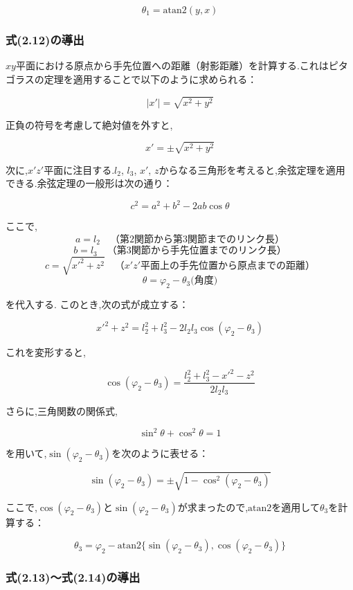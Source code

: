 \[
  \theta_1 = \text{atan2}(y, x) \tag{2.6}
\]

\subsubsection{式(2.12)の導出}

$xy$平面における原点から手先位置への距離（射影距離）を計算する.これはピタゴラスの定理を適用することで以下のように求められる：

\[
  |x'| = \sqrt{x^2 + y^2} \tag{2.7}
\]

正負の符号を考慮して絶対値を外すと,

\[
  x' = \pm \sqrt{x^2 + y^2} \tag{2.8}
\]

次に,$x'z'$平面に注目する.$l_2$, $l_3$, $x'$, $z$からなる三角形を考えると,余弦定理を適用できる.余弦定理の一般形は次の通り：

\[
  c^2 = a^2 + b^2 - 2ab \cos \theta \tag{2.9}
\]

ここで,
\[
  a = l_2 \quad \text{（第2関節から第3関節までのリンク長）}
\]
\[
  b = l_3 \quad \text{（第3関節から手先位置までのリンク長）}
\]
\[
  c = \sqrt{x'^2 + z^2} \quad \text{（$x'z'$平面上の手先位置から原点までの距離）}
\]
\[
  \theta = \varphi_2 - \theta_3 \text{(角度)}
\]

を代入する.
このとき,次の式が成立する：

\[
  x'^2 + z^2 = l_2^2 + l_3^2 - 2l_2 l_3 \cos (\varphi_2 - \theta_3)
\]

これを変形すると,

\[
  \cos(\varphi_2 - \theta_3) = \frac{l_2^2 + l_3^2 - x'^2 - z^2}{2 l_2 l_3} \tag{2.10}
\]

さらに,三角関数の関係式,

\[
  \sin^2 \theta + \cos^2 \theta = 1
\]

を用いて,$\sin(\varphi_2 - \theta_3)$を次のように表せる：

\[
  \sin(\varphi_2 - \theta_3) = \pm \sqrt{1 - \cos^2 (\varphi_2 - \theta_3)} \tag{2.11}
\]

ここで,$\cos(\varphi_2 - \theta_3)$と$\sin(\varphi_2 - \theta_3)$が求まったので,$\text{atan2}$を適用して$\theta_3$を計算する：

\[
  \theta_3 = \varphi_2 - \text{atan2} \{ \sin(\varphi_2 - \theta_3), \cos(\varphi_2 - \theta_3) \} \tag{2.12}
\]

\subsubsection{式(2.13)～式(2.14)の導出}

